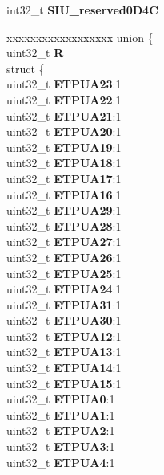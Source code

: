 \begin{DoxyCompactItemize}
\begin{tabbing}
\end{tabbing}\item 
\mbox{\label{structSIU__tag_aa7772afc20d7c75e3a09bf7ce15202b3}} 
int32\+\_\+t {\bfseries S\+I\+U\+\_\+reserved0\+D4C}
\item 
\mbox{\label{structSIU__tag_a077f70242464d29722f5895212229a05}} 
\begin{tabbing}
xx\=xx\=xx\=xx\=xx\=xx\=xx\=xx\=xx\=\kill
union \{\\
\>uint32\_t {\bfseries R}\\
\>struct \{\\
\>\>uint32\_t {\bfseries ETPUA23}:1\\
\>\>uint32\_t {\bfseries ETPUA22}:1\\
\>\>uint32\_t {\bfseries ETPUA21}:1\\
\>\>uint32\_t {\bfseries ETPUA20}:1\\
\>\>uint32\_t {\bfseries ETPUA19}:1\\
\>\>uint32\_t {\bfseries ETPUA18}:1\\
\>\>uint32\_t {\bfseries ETPUA17}:1\\
\>\>uint32\_t {\bfseries ETPUA16}:1\\
\>\>uint32\_t {\bfseries ETPUA29}:1\\
\>\>uint32\_t {\bfseries ETPUA28}:1\\
\>\>uint32\_t {\bfseries ETPUA27}:1\\
\>\>uint32\_t {\bfseries ETPUA26}:1\\
\>\>uint32\_t {\bfseries ETPUA25}:1\\
\>\>uint32\_t {\bfseries ETPUA24}:1\\
\>\>uint32\_t {\bfseries ETPUA31}:1\\
\>\>uint32\_t {\bfseries ETPUA30}:1\\
\>\>uint32\_t {\bfseries ETPUA12}:1\\
\>\>uint32\_t {\bfseries ETPUA13}:1\\
\>\>uint32\_t {\bfseries ETPUA14}:1\\
\>\>uint32\_t {\bfseries ETPUA15}:1\\
\>\>uint32\_t {\bfseries ETPUA0}:1\\
\>\>uint32\_t {\bfseries ETPUA1}:1\\
\>\>uint32\_t {\bfseries ETPUA2}:1\\
\>\>uint32\_t {\bfseries ETPUA3}:1\\
\>\>uint32\_t {\bfseries ETPUA4}:1\\

\end{tabbing}
\end{DoxyCompactItemize}
